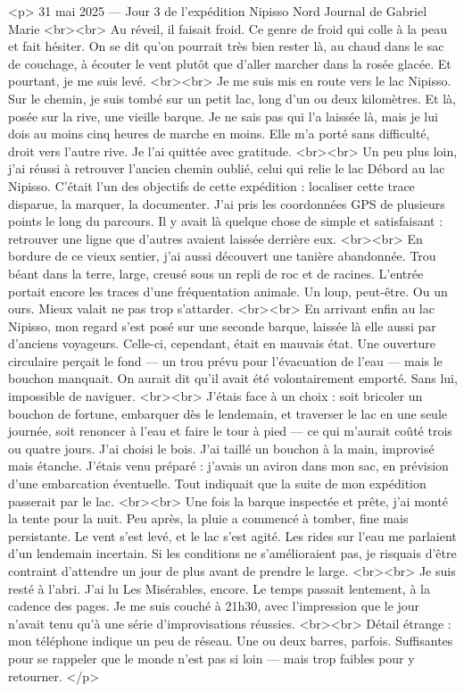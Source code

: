 <p>
31 mai 2025 — Jour 3 de l’expédition Nipisso Nord
Journal de Gabriel Marie
<br><br>
Au réveil, il faisait froid. Ce genre de froid qui colle à la peau et fait hésiter. On se dit qu’on pourrait très bien rester là, au chaud dans le sac de couchage, à écouter le vent plutôt que d’aller marcher dans la rosée glacée. Et pourtant, je me suis levé.
<br><br>
Je me suis mis en route vers le lac Nipisso. Sur le chemin, je suis tombé sur un petit lac, long d’un ou deux kilomètres. Et là, posée sur la rive, une vieille barque. Je ne sais pas qui l’a laissée là, mais je lui dois au moins cinq heures de marche en moins. Elle m’a porté sans difficulté, droit vers l’autre rive. Je l’ai quittée avec gratitude.
<br><br>
Un peu plus loin, j’ai réussi à retrouver l’ancien chemin oublié, celui qui relie le lac Débord au lac Nipisso. C’était l’un des objectifs de cette expédition : localiser cette trace disparue, la marquer, la documenter. J’ai pris les coordonnées GPS de plusieurs points le long du parcours. Il y avait là quelque chose de simple et satisfaisant : retrouver une ligne que d’autres avaient laissée derrière eux.
<br><br>
En bordure de ce vieux sentier, j’ai aussi découvert une tanière abandonnée. Trou béant dans la terre, large, creusé sous un repli de roc et de racines. L’entrée portait encore les traces d’une fréquentation animale. Un loup, peut-être. Ou un ours. Mieux valait ne pas trop s’attarder.
<br><br>
En arrivant enfin au lac Nipisso, mon regard s’est posé sur une seconde barque, laissée là elle aussi par d’anciens voyageurs. Celle-ci, cependant, était en mauvais état. Une ouverture circulaire perçait le fond — un trou prévu pour l’évacuation de l’eau — mais le bouchon manquait. On aurait dit qu’il avait été volontairement emporté. Sans lui, impossible de naviguer.
<br><br>
J’étais face à un choix : soit bricoler un bouchon de fortune, embarquer dès le lendemain, et traverser le lac en une seule journée, soit renoncer à l’eau et faire le tour à pied — ce qui m’aurait coûté trois ou quatre jours. J’ai choisi le bois. J’ai taillé un bouchon à la main, improvisé mais étanche. J’étais venu préparé : j’avais un aviron dans mon sac, en prévision d’une embarcation éventuelle. Tout indiquait que la suite de mon expédition passerait par le lac.
<br><br>
Une fois la barque inspectée et prête, j’ai monté la tente pour la nuit. Peu après, la pluie a commencé à tomber, fine mais persistante. Le vent s’est levé, et le lac s’est agité. Les rides sur l’eau me parlaient d’un lendemain incertain. Si les conditions ne s’amélioraient pas, je risquais d’être contraint d’attendre un jour de plus avant de prendre le large.
<br><br>
Je suis resté à l’abri. J’ai lu Les Misérables, encore. Le temps passait lentement, à la cadence des pages. Je me suis couché à 21h30, avec l’impression que le jour n’avait tenu qu’à une série d’improvisations réussies.
<br><br>
Détail étrange : mon téléphone indique un peu de réseau. Une ou deux barres, parfois. Suffisantes pour se rappeler que le monde n’est pas si loin — mais trop faibles pour y retourner.
</p>



